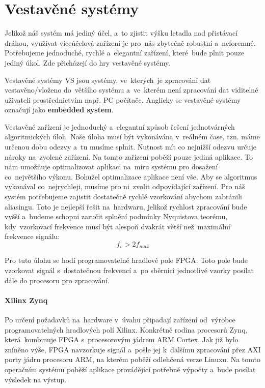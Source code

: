 		\section{Vestavěné systémy}
			Jelikož náš systém má jediný účel, a~to zjistit výšku letadla nad přistávací dráhou, využívat víceúčelová zařízení je pro~nás zbytečně robustní a~neforemné. Potřebujeme jednoduché, rychlé a~elegantní zařízení, které~bude plnit pouze jediný úkol. Zde přicházejí do hry vestavěné systémy.
			
			\begin{definice}
				Vestavěné systémy VS jsou systémy, ve~kterých~je zpracování dat vestavěno/vloženo do~většího systému a~ve~kterém není zpracování dat viditelné uživateli prostřednictvím např. PC počítače. Anglicky se vestavěné systémy označují jako \textbf{embedded system}\cite{impSkripta}.
			\end{definice}
			
			Vestavěné zařízení je jednoduchý a~elegantní způsob řešení jednotvárných algoritmických úloh. Naše úloha musí být vykonávána v~reálném čase, tzn. máme určenou dobu odezvy a~tu musíme splnit. Nutnost mít co nejnižší odezvu určuje nároky na~zvolené zařízení. Na tomto zařízení poběží pouze jediná aplikace. To nám umožňuje optimalizovat aplikaci na~míru systému pro dosažení co~největšího výkonu.
			Bohužel optimalizace aplikace není vše. Aby se algoritmus vykonával co~nejrychleji, musíme pro ni~zvolit odpovídající zařízení. Pro náš systém potřebujeme zajistit dostatečně rychlé vzorkování abychom zabránili aliasingu. Toto je nejlepší řešit na~hardwaru, jelikož rychlost zpracování bude vyšší a~budeme schopni zaručit splnění podmínky Nyquistova teorému, kdy~vzorkovací frekvence musí být alespoň dvakrát větší než~maximální frekvence signálu: \[f_v > 2f_{max}\]
			
			Pro tuto úlohu se hodí programovatelné hradlové pole FPGA. Toto pole bude vzorkovat signál s~dostatečnou frekvencí a~po sběrnici jednotlivé vzorky posílat dále do procesoru pro zpracování.\par
			
			\paragraph{Xilinx Zynq}
				Po určení požadavků na~hardware v~úvahu připadají zařízení od~výrobce programovatelných hradlových polí Xilinx. Konkrétně rodina procesorů Zynq, která~kombinuje FPGA s~procesorovým jádrem ARM Cortex.
				Jak již bylo zníněno výše, FPGA navzorkuje signál a~pošle jej k~dalšímu zpracování přez AXI porty jádru procesoru ARM, na kterém poběží odlehčená verze Linuxu. Na tomto operačním systému poběží aplikace provádějící potřebné výpočty a~bude posílat výsledek na výstup.
				
